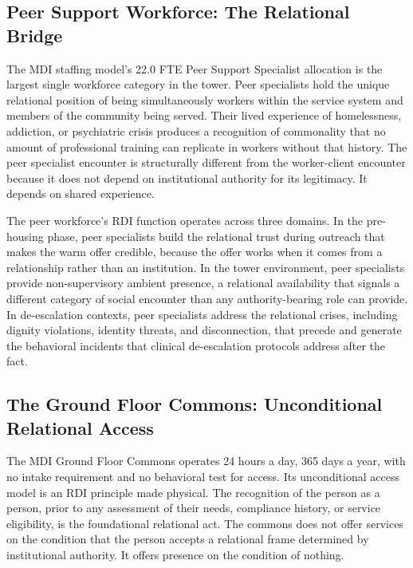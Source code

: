 \documentclass[12pt, letterpaper]{article}
\begin{document}
\subsection{Peer Support Workforce: The Relational Bridge}

The MDI staffing model's 22.0 FTE Peer Support Specialist allocation is the largest single workforce category in the tower. Peer specialists hold the unique relational position of being simultaneously workers within the service system and members of the community being served. Their lived experience of homelessness, addiction, or psychiatric crisis produces a recognition of commonality that no amount of professional training can replicate in workers without that history. The peer specialist encounter is structurally different from the worker-client encounter because it does not depend on institutional authority for its legitimacy. It depends on shared experience.

The peer workforce's RDI function operates across three domains. In the pre-housing phase, peer specialists build the relational trust during outreach that makes the warm offer credible, because the offer works when it comes from a relationship rather than an institution. In the tower environment, peer specialists provide non-supervisory ambient presence, a relational availability that signals a different category of social encounter than any authority-bearing role can provide. In de-escalation contexts, peer specialists address the relational crises, including dignity violations, identity threats, and disconnection, that precede and generate the behavioral incidents that clinical de-escalation protocols address after the fact.

\subsection{The Ground Floor Commons: Unconditional Relational Access}

The MDI Ground Floor Commons operates 24 hours a day, 365 days a year, with no intake requirement and no behavioral test for access. Its unconditional access model is an RDI principle made physical. The recognition of the person as a person, prior to any assessment of their needs, compliance history, or service eligibility, is the foundational relational act. The commons does not offer services on the condition that the person accepts a relational frame determined by institutional authority. It offers presence on the condition of nothing.
\end{document}
